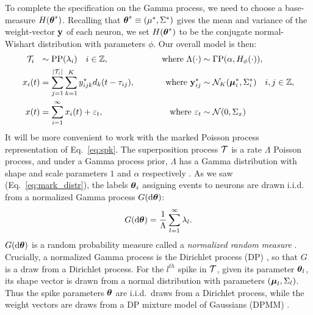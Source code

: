 To complete the specification on the Gamma process, we need to choose a base-measure $H(\boldsymbol{\theta}^*)$.
Recalling that $\boldsymbol{\theta}^* \equiv (\mu^*, \Sigma^*)$ gives the mean and variance of the weight-vector $\mathbf{y}$ of each neuron, we set $H(\boldsymbol{\theta}^*)$ 
to be the conjugate normal-Wishart distribution with parameters $\phi$. Our overall model is then:
\begin{subequations}
\begin{align}
  \mc{T}_i\ \  &\sim \text{PP}(\lambda_i) \quad i \in \ZZ, \qquad &\text{ where } \Lambda(\cdot) &\sim \Gamma \text{P}(\alpha, H_{\phi}(\cdot)), \\ %
  x_i(t) &= \sum_{j = 1}^{|\mc{T}_i|}  \sum_{k = 1}^{K} y^*_{ijk} d_k(t - \tau_{ij}), \qquad &\text{ where }\by^*_{ij}  &\sim \mc{N}_K(\mb{\mu}^*_i, \Sigma^*_i) \quad i,j \in \ZZ, \\
  x(t)   &= \sum_{i=1}^{\infty} x_i(t) + \eps_t, \qquad &\text{ where } \eps_t &\sim \mc{N}(0,\Sigma_x)
\end{align}
\end{subequations}
% 
It will be more convenient to work with the marked Poisson process representation of Eq.~\eqref{eq:spk}. %
The superposition process $\mathcal{T}$ is a rate $\Lambda$ Poisson process,
and under a Gamma process prior, $\Lambda$ has a Gamma distribution with shape and scale parameters $1$ and $\alpha$ respectively \citep{Ferguson73}.
As we saw (Eq.~\eqref{eq:mark_distr}), the labels $\boldsymbol{\theta}_i$ assigning events to neurons are drawn i.i.d. from a normalized Gamma 
process $G(\mathrm{d} \boldsymbol{\theta})$:
\begin{align}
 G(\mathrm{d} \boldsymbol{\theta}) = \frac{1}{\Lambda} \sum_{l=1}^{\infty} \lambda_l.
\end{align}
$G(\mathrm{d} \boldsymbol{\theta})$ is a random probability measure called a \emph{normalized random measure} \citep{JamesLP09}. Crucially, a 
normalized Gamma process is the Dirichlet process (DP) \citep{Ferguson73}, so that $G$ is a draw from a Dirichlet process. For the $l^{th}$ spike in $\mathcal{T}$, given its 
parameter $\boldsymbol{\theta}_l$, its shape vector is drawn from a normal distribution
with parameters $(\boldsymbol{\mu}_{l}, \Sigma_{l})$. Thus the spike parameters $\boldsymbol{\theta}$ are i.i.d.\ draws from a Dirichlet process, while the weight vectors are
draws from a DP mixture model of Gaussians (DPMM) \citep{Lo1984}.

